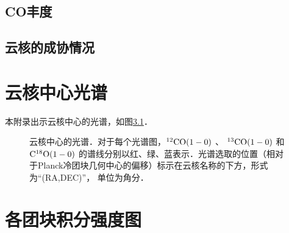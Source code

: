 \documentclass[UTF8, nocolorlinks]{pkuthss}
\newcommand{\coaa}{$\rm^{12}CO(1-0)$ }
\newcommand{\cobb}{$\rm^{13}CO(1-0)$ }
\newcommand{\cocc}{$\rm C^{18}O(1-0)$ }
\newcommand{\nnhyd}{$n_{\rm H_2}$\ }
\newcommand{\numcore}{38\ }
\begin{document}

	\section{CO丰度}
	\section{云核的成协情况}

\appendix 

\printbibliography[heading = bibintoc]

\chapter{云核中心光谱}\label{App.Spectra}
	本附录出示云核中心的光谱，如图\ref{Fig.Spectra}．

	\begin{figure}[h]
		\caption{云核中心的光谱．对于每个光谱图，\coaa 、 \cobb 和 \cocc   的谱线分别以红、绿、蓝表示．光谱选取的位置（相对于Planck冷团块几何中心的偏移）标示在云核名称的下方，形式为“(RA,DEC)”， 单位为角分．\label{Fig.Spectra}}
	\end{figure}
		\vspace{-18mm}

\chapter{各团块积分强度图}\label{App.Map}
	
\end{document}
